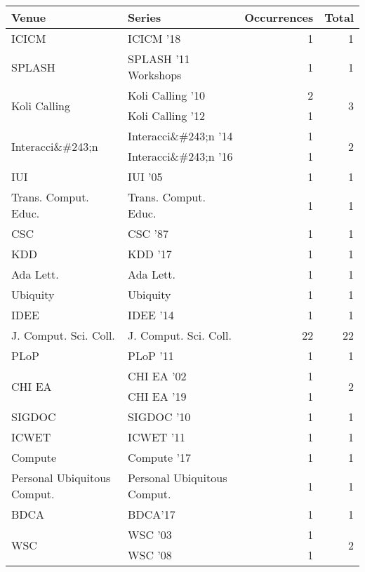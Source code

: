 \begin{table*}[t]
\begin{tabular}{llrr}
Venue & Series & Occurrences & Total\\\hline
\multirow{1}{*}{ICICM } & ICICM '18 & 1 & \multirow{1}{*}{1}\\
\multirow{1}{*}{SPLASH } & SPLASH '11 Workshops & 1 & \multirow{1}{*}{1}\\
\multirow{2}{*}{Koli Calling } & Koli Calling '10 & 2 & \multirow{2}{*}{3}\\
& Koli Calling '12 & 1 &\\
\multirow{2}{*}{Interacci\&\#243;n } & Interacci\&\#243;n '14 & 1 & \multirow{2}{*}{2}\\
& Interacci\&\#243;n '16 & 1 &\\
\multirow{1}{*}{IUI } & IUI '05 & 1 & \multirow{1}{*}{1}\\
\multirow{1}{*}{Trans. Comput. Educ.} & Trans. Comput. Educ. & 1 & \multirow{1}{*}{1}\\
\multirow{1}{*}{CSC } & CSC '87 & 1 & \multirow{1}{*}{1}\\
\multirow{1}{*}{KDD } & KDD '17 & 1 & \multirow{1}{*}{1}\\
\multirow{1}{*}{Ada Lett.} & Ada Lett. & 1 & \multirow{1}{*}{1}\\
\multirow{1}{*}{Ubiquity} & Ubiquity & 1 & \multirow{1}{*}{1}\\
\multirow{1}{*}{IDEE } & IDEE '14 & 1 & \multirow{1}{*}{1}\\
\multirow{1}{*}{J. Comput. Sci. Coll.} & J. Comput. Sci. Coll. & 22 & \multirow{1}{*}{22}\\
\multirow{1}{*}{PLoP } & PLoP '11 & 1 & \multirow{1}{*}{1}\\
\multirow{2}{*}{CHI EA } & CHI EA '02 & 1 & \multirow{2}{*}{2}\\
& CHI EA '19 & 1 &\\
\multirow{1}{*}{SIGDOC } & SIGDOC '10 & 1 & \multirow{1}{*}{1}\\
\multirow{1}{*}{ICWET } & ICWET '11 & 1 & \multirow{1}{*}{1}\\
\multirow{1}{*}{Compute } & Compute '17 & 1 & \multirow{1}{*}{1}\\
\multirow{1}{*}{Personal Ubiquitous Comput.} & Personal Ubiquitous Comput. & 1 & \multirow{1}{*}{1}\\
\multirow{1}{*}{BDCA} & BDCA'17 & 1 & \multirow{1}{*}{1}\\
\multirow{2}{*}{WSC } & WSC '03 & 1 & \multirow{2}{*}{2}\\
& WSC '08 & 1 &\\

\end{tabular}
\end{table*}

